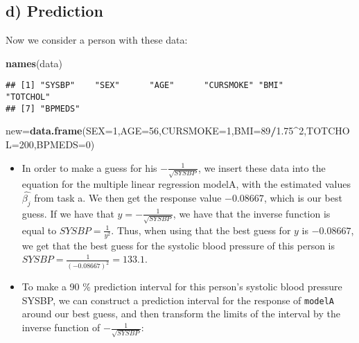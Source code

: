 \documentclass[]{article}
\newenvironment{Shaded}{\begin{snugshade}}{\end{snugshade}}
\newcommand{\KeywordTok}[1]{\textcolor[rgb]{0.13,0.29,0.53}{\textbf{#1}}}
\newcommand{\DataTypeTok}[1]{\textcolor[rgb]{0.13,0.29,0.53}{#1}}
\newcommand{\DecValTok}[1]{\textcolor[rgb]{0.00,0.00,0.81}{#1}}
\newcommand{\FloatTok}[1]{\textcolor[rgb]{0.00,0.00,0.81}{#1}}
\newcommand{\OperatorTok}[1]{\textcolor[rgb]{0.81,0.36,0.00}{\textbf{#1}}}
\newcommand{\NormalTok}[1]{#1}
\begin{document}
\subsection{d) Prediction}\label{d-prediction}

Now we consider a person with these data:

\begin{Shaded}
\begin{Highlighting}[]
\KeywordTok{names}\NormalTok{(data)}
\end{Highlighting}
\end{Shaded}

\begin{verbatim}
## [1] "SYSBP"    "SEX"      "AGE"      "CURSMOKE" "BMI"      "TOTCHOL" 
## [7] "BPMEDS"
\end{verbatim}

\begin{Shaded}
\begin{Highlighting}[]
\NormalTok{new=}\KeywordTok{data.frame}\NormalTok{(}\DataTypeTok{SEX=}\DecValTok{1}\NormalTok{,}\DataTypeTok{AGE=}\DecValTok{56}\NormalTok{,}\DataTypeTok{CURSMOKE=}\DecValTok{1}\NormalTok{,}\DataTypeTok{BMI=}\DecValTok{89}\OperatorTok{/}\FloatTok{1.75}\OperatorTok{^}\DecValTok{2}\NormalTok{,}\DataTypeTok{TOTCHOL=}\DecValTok{200}\NormalTok{,}\DataTypeTok{BPMEDS=}\DecValTok{0}\NormalTok{)}
\end{Highlighting}
\end{Shaded}

\begin{itemize}
\item
  In order to make a guess for his \(-\frac{1}{\sqrt{SYSBP}}\), we
  insert these data into the equation for the multiple linear regression
  modelA, with the estimated values \(\hat{\beta_j}\) from task a. We
  then get the response value \(-0.08667\), which is our best guess. If
  we have that \(y=-\frac{1}{\sqrt{SYSBP}}\), we have that the inverse
  function is equal to \(SYSBP=\frac{1}{y^2}\). Thus, when using that
  the best guess for \(y\) is \(-0.08667\), we get that the best guess
  for the systolic blood pressure of this person is
  \(SYSBP = \frac{1}{(-0.08667)^2} = 133.1\).
\item
  To make a 90 \% prediction interval for this person's systolic blood
  pressure SYSBP, we can construct a prediction interval for the
  response of \texttt{modelA} around our best guess, and then transform
  the limits of the interval by the inverse function of
  \(-\frac{1}{\sqrt{SYSBP}}\):
\end{itemize}
\end{document}
